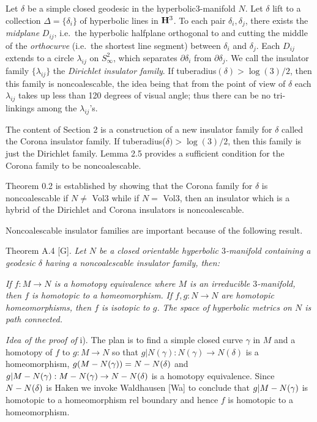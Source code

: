 Let $\delta$ be a simple closed geodesic in the
hyperbolic\break $3$-manifold $N$.  Let $\delta$ lift  to a collection
$\Delta=\{\delta_i\}$ of hyperbolic lines in ${\bf H}^3$.  To each pair
$\delta_i,\delta_j$, there exists the {\it midplane} $D_{ij}$, i.e.\ the
hyperbolic halfplane orthogonal to and cutting the middle of the {\it
orthocurve}
(i.e.\ the shortest line segment) between $\delta_i$ and $\delta_j$.
Each
$D_{ij}$  extends to a circle $\lambda_{ij}$ on $S^2_{\infty}$, which
separates  $\partial \delta_i$ from $\partial\delta_j$. We call the
insulator family
$\{\lambda_{ij}\}$ the {\it Dirichlet insulator family}.    If
tuberadius$(\delta)>\log(3)/2$,
then this family is noncoalescable, the idea being that from the point of
view of
$\delta$ each $\lambda_{ij}$ takes up less than 120 degrees of visual
angle;  thus there can
be no tri-linkings among the $\lambda_{ij}$'s. 
\enddemo

The content of Section 2 is a construction of a new insulator family for $\delta$ called the Corona insulator family.  If
tuberadius($\delta)>{\log}(3)/2$, then this family is just the Dirichlet family.  Lemma 2.5 provides a sufficient condition for the
Corona family to be noncoalescable. 

Theorem 0.2 is established by showing that the Corona family for $\delta$ is noncoalescable if $N\neq $ Vol3 while if $N=$ Vol3, then an insulator which 
is a hybrid of the Dirichlet and Corona insulators is noncoalescable.

Noncoalescable insulator families are important because of the following
result.

 {\elevensc Theorem  A.4} [G].  {\it Let $N$ be a closed  orientable hyperbolic
$3$\/{\rm -}\/manifold containing a geodesic $\delta$ having a noncoalescable
insulator family{\rm ,}   then\/{\rm :}}
\begin{itemize}
  {\it If $f:M\to N$ is a homotopy equivalence where $M$ is
an irreducible $3$\/{\rm -}\/manifold{\rm ,} then $f$
is  homotopic to a homeomorphism.}
 {\it If $f,g:N\to N$ are homotopic  homeomorphisms{\rm ,} then $f$ is
isotopic to $g$.}
 {\it The space of hyperbolic metrics on $N$ is path connected.}
\end{itemize}
 

{\it Idea of the proof of} i).  The plan is to find a simple closed curve $\gamma$ in $M$ and a homotopy of $f$ to $g:M\to N$ so that
$g|N(\gamma):N(\gamma)\to N(\delta)$ is a homeomorphism, 
$g(M-\ncirc(\gamma))=N-\ncirc (\delta)$ and $g|M- \ncirc (\gamma):M- \ncirc (\gamma)\to
N- \ncirc (\delta)$ is a homotopy equivalence.  Since $N- \ncirc (\delta)$ is
Haken we invoke
Waldhausen [Wa] to conclude that $g|M- \ncirc (\gamma)$ is homotopic to a
homeomorphism rel
boundary and hence $f$ is homotopic to a homeomorphism.

